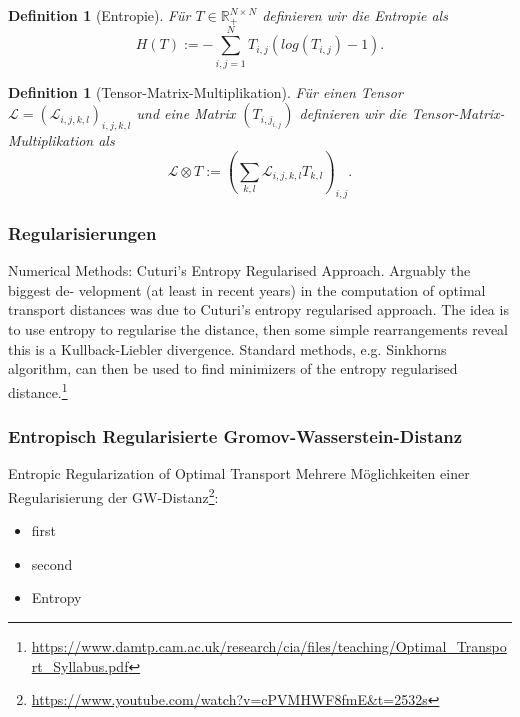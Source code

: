 \documentclass[twoside, 11pt,a4paper]{article}
\newtheorem{definition}[theorem]{Definition}
\numberwithin{equation}{section}
\begin{document}
	\begin{definition}[Entropie]
		Für $T \in \mathbb{R}_{+}^{N \times N}$ definieren wir die Entropie als
		\begin{equation}
			H(T) := - \sum_{i,j=1}^N{T_{i,j}(log(T_{i,j})-1)}.
		\end{equation}
	\end{definition}

	


	\begin{definition}[Tensor-Matrix-Multiplikation]
		Für einen Tensor $\mathcal{L} = (\mathcal{L}_{i,j,k,l})_{i,j,k,l}$ und eine Matrix $(T_{{i,j}_{i,j}})$ definieren wir die Tensor-Matrix-Multiplikation als
		\begin{equation}
		\mathcal{L} \otimes T := (\sum_{k,l}{\mathcal{L}_{i,j,k,l}T_{k,l}})_{i,j}.
		\end{equation}
	\end{definition}
	
	\subsubsection{Regularisierungen}
	
	
	Numerical Methods: Cuturi’s Entropy Regularised Approach. Arguably the biggest de-
	velopment (at least in recent years) in the computation of optimal transport distances was
	due to Cuturi’s entropy regularised approach. The idea is to use entropy to regularise the
	distance, then some simple rearrangements reveal this is a Kullback-Liebler divergence.
	Standard methods, e.g. Sinkhorns algorithm, can then be used to find minimizers of the
	entropy regularised distance.\footnote{\url{https://www.damtp.cam.ac.uk/research/cia/files/teaching/Optimal_Transport_Syllabus.pdf}}
	
	\subsubsection{Entropisch Regularisierte Gromov-Wasserstein-Distanz}
	Entropic Regularization of Optimal Transport \cite{computationalOT}
	Mehrere Möglichkeiten einer Regularisierung der GW-Distanz\footnote{\url{https://www.youtube.com/watch?v=cPVMHWF8fmE&t=2532s}}:
	\begin{itemize}
		\item first\\
		\item second \\
		\item Entropy
	\end{itemize} 
	
\end{document}
